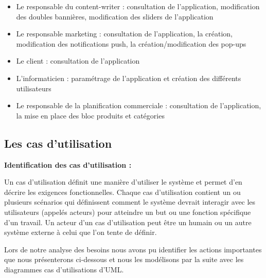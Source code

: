 \begin{itemize}[label=\textbullet, font=\LARGE \color{blue}] 
	\item  Le responsable du content-writer : consultation de l’application, modification des doubles bannières, modification des sliders de l’application 
	\item  Le responsable marketing : consultation de l’application, la création, modification des notifications push, la création/modification des pop-ups
	\item  Le client : consultation de l’application
	\item  L’informaticien : paramétrage de l’application et création des différents utilisateurs
	\item  Le responsable de la planification commerciale : consultation de l’application, la mise en place des bloc produits et catégories
\end{itemize}

\subsection{Les cas d'utilisation}

\textbf{Identification des cas d’utilisation :}

Un cas d’utilisation définit une manière d’utiliser le système et permet d’en décrire les exigences fonctionnelles. Chaque cas d’utilisation contient un ou plusieurs scénarios qui définissent comment le système devrait interagir avec les utilisateurs (appelés acteurs) pour atteindre un but ou une fonction spécifique d’un travail. Un acteur d’un cas d’utilisation peut être un humain ou un autre système externe à celui que l’on tente de définir.

Lors de notre analyse des besoins nous avons pu identifier les actions importantes que nous présenterons ci-dessous et nous les modélisons par la suite avec les diagrammes cas d’utilisations d’UML.

